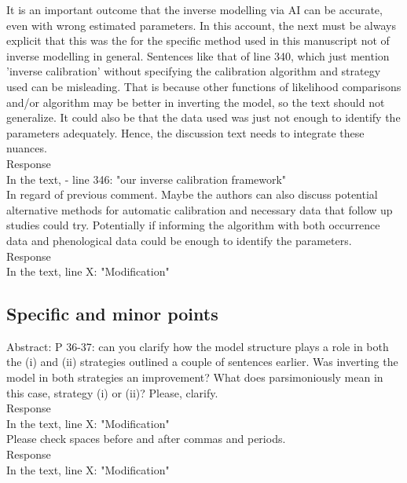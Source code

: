 \documentclass[a4paper, 11pt]{article}
\begin{document}
\noindent It is an important outcome that the inverse modelling via AI can be accurate, even with wrong estimated parameters. In this account, the next must be always explicit that this was the for the specific method used in this manuscript not of inverse modelling in general. Sentences like that of line 340, which just mention 'inverse calibration' without specifying the calibration algorithm and strategy used can be misleading. That is because other functions of likelihood comparisons and/or algorithm may be better in inverting the model, so the text should not generalize. It could also be that the data used was just not enough to identify the parameters adequately. Hence, the discussion text needs to integrate these nuances.\\
\textcolor{customblue}{Response}\\
In the text, 
- line 346: \textcolor{customred}{"our inverse calibration framework"}\\ 

\noindent In regard of previous comment. Maybe the authors can also discuss potential alternative methods for automatic calibration and necessary data that follow up studies could try. Potentially if informing the algorithm with both occurrence data and phenological data could be enough to identify the parameters.\\
\textcolor{customblue}{Response}\\
In the text, line X: \textcolor{customred}{"Modification"}

\subsection{Specific and minor points}

\noindent Abstract: P 36-37: can you clarify how the model structure plays a role in both the (i) and (ii) strategies outlined a couple of sentences earlier. Was inverting the model in both strategies an improvement? What does parsimoniously mean in this case, strategy (i) or (ii)? Please, clarify.\\
\textcolor{customblue}{Response}\\
In the text, line X: \textcolor{customred}{"Modification"}\\

\noindent Please check spaces before and after commas and periods.\\
\textcolor{customblue}{Response}\\
In the text, line X: \textcolor{customred}{"Modification"}\\
\end{document}

